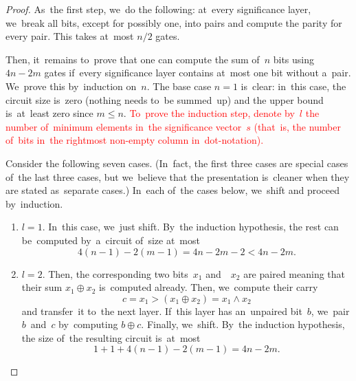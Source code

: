 \documentclass[a4paper, UKenglish, cleveref, autoref,  thm-restate]{lipics-v2021}
\begin{document}
    \begin{proof}
        As~the first step, we~do the following: at~every significance layer,
        we~break all bits, except for possibly one, into pairs and compute
        the parity for every pair. This takes at~most $n/2$ gates.

        \begin{center}
        \end{center}

        Then, it~remains to~prove that one can compute the sum of~$n$ bits
        using $4n-2m$ gates if~every significance layer contains at~most one bit
        without a~pair. We~prove this by~induction on~$n$. The base case $n=1$ is~clear: in~this case, the circuit size is~zero (nothing needs to~be summed~up) and the upper bound is~at~least zero since $m \le n$. 
        \textcolor{red}{To~prove the induction step,
        denote by~$l$ the number 
        of~minimum elements in~the significance vector~$s$
        (that~is, the number of~bits in~the rightmost non-empty column in~dot-notation).}

        Consider the following seven cases. (In~fact, the first three cases are special cases of~the last three cases, but we~believe that the presentation is~cleaner when they are stated
        as~separate cases.)
        In~each of~the cases below, we~shift and proceed by~induction.

        \begin{enumerate}
            \item $l=1$. In~this case, we~just shift.
            By~the induction hypothesis, the rest can be~computed by~a~circuit
            of~size at~most
            \[4(n-1)-2(m-1)=4n-2m-2<4n-2m.\]

            \item $l=2$. Then, the corresponding two bits~$x_1$ and~~$x_2$ are paired meaning that their sum $x_1 \oplus x_2$ is~computed already.
            Then, we~compute their carry
            \[c=x_1 > (x_1 \oplus x_2)=x_1 \land x_2\]
            and transfer~it to~the next layer.
            If~this layer has an~unpaired bit~$b$, we~pair $b$~and~$c$
            by~computing $b \oplus c$. Finally, we~shift.
            By~the induction hypothesis, the size of~the resulting circuit is~at~most
            \[1+1+4(n-1)-2(m-1)=4n-2m.\]


\end{enumerate}
\end{proof}
\end{document}
